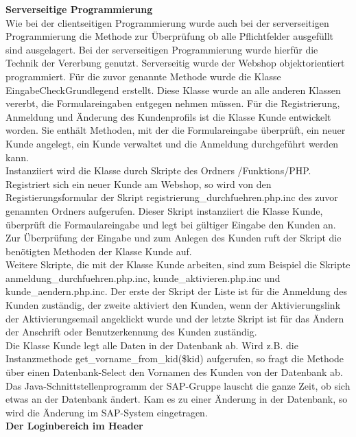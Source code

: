 \textbf{Serverseitige Programmierung}\\
Wie bei der clientseitigen Programmierung wurde auch bei der serverseitigen Programmierung die Methode zur Überprüfung ob alle Pflichtfelder ausgefüllt sind ausgelagert. Bei der serverseitigen Programmierung wurde hierfür die Technik der Vererbung genutzt. Serverseitig wurde der Webshop objektorientiert programmiert. Für die zuvor genannte Methode wurde die Klasse \glqq EingabeCheckGrundlegend\grqq{} erstellt. Diese Klasse wurde an alle anderen Klassen vererbt, die Formulareingaben entgegen nehmen müssen. Für die Registrierung, Anmeldung und Änderung des Kundenprofils ist die Klasse \glqq Kunde\grqq{} entwickelt worden. Sie enthält Methoden, mit der die Formulareingabe überprüft, ein neuer Kunde angelegt, ein Kunde verwaltet und die Anmeldung durchgeführt werden kann.\\
Instanziiert wird die Klasse durch Skripte des Ordners \glqq /Funktions/PHP\grqq{}. Registriert sich ein neuer Kunde am Webshop, so wird von den Registierungsformular der Skript \glqq registrierung\_durchfuehren.php.inc\grqq{} des zuvor genannten Ordners aufgerufen. Dieser Skript instanziiert die Klasse \glqq Kunde\grqq{}, überprüft die Formaulareingabe und legt bei gültiger Eingabe den Kunden an. Zur Überprüfung der Eingabe und zum Anlegen des Kunden ruft der Skript die benötigten Methoden der Klasse \glqq Kunde\grqq{} auf.\\
Weitere Skripte, die mit der Klasse \glqq Kunde\grqq{} arbeiten, sind zum Beispiel die Skripte \glqq anmeldung\_durchfuehren.php.inc\grqq{}, \glqq kunde\_aktivieren.php.inc\grqq{} und \glqq kunde\_aendern.php.inc\grqq{}. Der erste der Skript der Liste ist für die Anmeldung des Kunden zuständig, der zweite aktiviert den Kunden, wenn der Aktivierungslink der Aktivierungsemail angeklickt wurde und der letzte Skript ist für das Ändern der Anschrift oder Benutzerkennung des Kunden zuständig.\\
Die Klasse \glqq Kunde\grqq{} legt alle Daten in der Datenbank ab. Wird z.B. die Instanzmethode \glqq get\_vorname\_from\_kid(\$kid)\grqq{} aufgerufen, so fragt die Methode über einen Datenbank-Select den Vornamen des Kunden von der Datenbank ab. Das Java-Schnittstellenprogramm der SAP-Gruppe lauscht die ganze Zeit, ob sich etwas an der Datenbank ändert. Kam es zu einer Änderung in der Datenbank, so wird die Änderung im SAP-System eingetragen.\\

\textbf{Der Loginbereich im Header}\\

